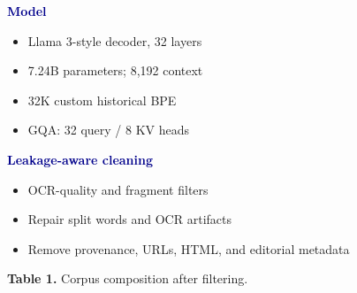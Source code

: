 \documentclass[portrait,a0paper,fontscale=0.42]{baposter}
\begin{document}
\begin{poster}
{        \vspace{7pt}
        \begin{minipage}[t]{0.42\textwidth}
            \small
            \textcolor{DarkBlue}{\textbf{Model}}
            \begin{itemize}
                \item Llama 3-style decoder, 32 layers
                \item 7.24B parameters; 8,192 context
                \item 32K custom historical BPE
                \item GQA: 32 query / 8 KV heads
            \end{itemize}
            \textcolor{DarkBlue}{\textbf{Leakage-aware cleaning}}
            \begin{itemize}
                \item OCR-quality and fragment filters
                \item Repair split words and OCR artifacts
                \item Remove provenance, URLs, HTML, and editorial metadata
            \end{itemize}
        \end{minipage}
        \hfill
        \begin{minipage}[t]{0.54\textwidth}
            \centering
            \scriptsize
            \par\vspace{1pt}
            \scriptsize\textbf{Table 1.} Corpus composition after filtering.
        \end{minipage}
    }


\end{poster}
\end{document}
